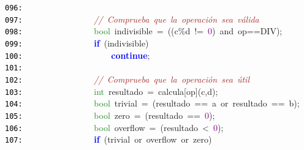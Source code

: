\documentclass[a4paper,10pt]{scrartcl}
\begin{document}
{   \mbox{}\texttt{\textcolor{Black}{096:}} \ \ \ \ \ \ \ \  \\
   \mbox{}\texttt{\textcolor{Black}{097:}} \ \ \ \ \ \ \ \ \ \ \ \ \ \ \ \ \textit{\textcolor{Brown}{//\ Comprueba\ que\ la\ operación\ sea\ válida}} \\
   \mbox{}\texttt{\textcolor{Black}{098:}} \ \ \ \ \ \ \ \ \ \ \ \ \ \ \ \ \textcolor{ForestGreen}{bool}\ indivisible\ \textcolor{BrickRed}{=}\ \textcolor{BrickRed}{((}c\textcolor{BrickRed}{\%}d\ \textcolor{BrickRed}{!=}\ \textcolor{Purple}{0}\textcolor{BrickRed}{)}\ \textcolor{TealBlue}{and}\ op\textcolor{BrickRed}{==}DIV\textcolor{BrickRed}{);} \\
   \mbox{}\texttt{\textcolor{Black}{099:}} \ \ \ \ \ \ \ \ \ \ \ \ \ \ \ \ \textbf{\textcolor{Blue}{if}}\ \textcolor{BrickRed}{(}indivisible\textcolor{BrickRed}{)} \\
   \mbox{}\texttt{\textcolor{Black}{100:}} \ \ \ \ \ \ \ \ \ \ \ \ \ \ \ \ \ \ \ \ \textbf{\textcolor{Blue}{continue}}\textcolor{BrickRed}{;} \\
   \mbox{}\texttt{\textcolor{Black}{101:}} \ \ \ \ \ \ \ \  \\
   \mbox{}\texttt{\textcolor{Black}{102:}} \ \ \ \ \ \ \ \ \ \ \ \ \ \ \ \ \textit{\textcolor{Brown}{//\ Comprueba\ que\ la\ operación\ sea\ útil}} \\
   \mbox{}\texttt{\textcolor{Black}{103:}} \ \ \ \ \ \ \ \ \ \ \ \ \ \ \ \ \textcolor{ForestGreen}{int}\ resultado\ \textcolor{BrickRed}{=}\ calcula\textcolor{BrickRed}{[}op\textcolor{BrickRed}{](}c\textcolor{BrickRed}{,}d\textcolor{BrickRed}{);} \\
   \mbox{}\texttt{\textcolor{Black}{104:}} \ \ \ \ \ \ \ \ \ \ \ \ \ \ \ \ \textcolor{ForestGreen}{bool}\ trivial\ \textcolor{BrickRed}{=}\ \textcolor{BrickRed}{(}resultado\ \textcolor{BrickRed}{==}\ a\ \textcolor{TealBlue}{or}\ resultado\ \textcolor{BrickRed}{==}\ b\textcolor{BrickRed}{);} \\
   \mbox{}\texttt{\textcolor{Black}{105:}} \ \ \ \ \ \ \ \ \ \ \ \ \ \ \ \ \textcolor{ForestGreen}{bool}\ zero\ \textcolor{BrickRed}{=}\ \textcolor{BrickRed}{(}resultado\ \textcolor{BrickRed}{==}\ \textcolor{Purple}{0}\textcolor{BrickRed}{);} \\
   \mbox{}\texttt{\textcolor{Black}{106:}} \ \ \ \ \ \ \ \ \ \ \ \ \ \ \ \ \textcolor{ForestGreen}{bool}\ overflow\ \textcolor{BrickRed}{=}\ \textcolor{BrickRed}{(}resultado\ \textcolor{BrickRed}{\textless{}}\ \textcolor{Purple}{0}\textcolor{BrickRed}{);} \\
   \mbox{}\texttt{\textcolor{Black}{107:}} \ \ \ \ \ \ \ \ \ \ \ \ \ \ \ \ \textbf{\textcolor{Blue}{if}}\ \textcolor{BrickRed}{(}trivial\ or\ overflow\ \textcolor{TealBlue}{or}\ zero\textcolor{BrickRed}{)} \\
}
\end{document}
